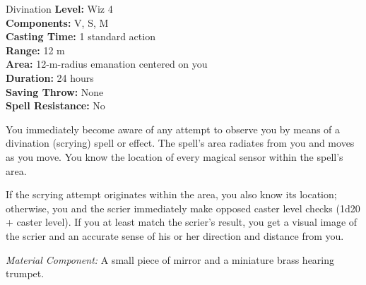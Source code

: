 {Divination}
{
	\textbf{Level:}
	Wiz 4\\
	\textbf{Components:}
	V, S, M\\
	\textbf{Casting Time:}
	1 standard action\\
	\textbf{Range:}
	12 m\\
	\textbf{Area:}
	12-m-radius emanation centered on you\\
	\textbf{Duration:}
	24 hours\\
	\textbf{Saving Throw:}
	None\\
	\textbf{Spell Resistance:}
	No\\
}
{
	You immediately become aware of any attempt to observe you by means of a divination (scrying) spell or effect. The spell's area radiates from you and moves as you move. You know the location of every magical sensor within the spell's area.

	If the scrying attempt originates within the area, you also know its location; otherwise, you and the scrier immediately make opposed caster level checks (1d20 + caster level). If you at least match the scrier's result, you get a visual image of the scrier and an accurate sense of his or her direction and distance from you.

	\textit{Material Component:}
	A small piece of mirror and a miniature brass hearing trumpet.

}
